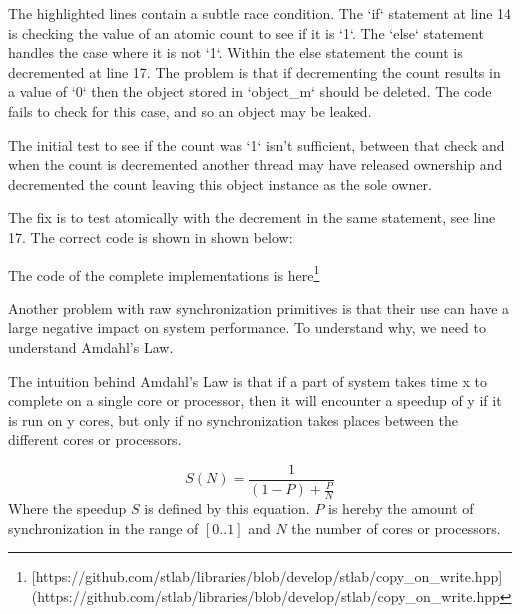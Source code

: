 \begin{minipage}{\linewidth}
	
\end{minipage}

The highlighted lines contain a subtle race condition. The `if` statement at line 14 is checking the value of an atomic count to see if it is `1`. The `else` statement handles the case where it is not `1`. Within the else statement the count is decremented at line 17. The problem is that if decrementing the count results in a value of `0` then the object stored in `object\_m` should be deleted. The code fails to check for this case, and so an object may be leaked.

The initial test to see if the count was `1` isn't sufficient, between that check and when the count is decremented another thread may have released ownership and decremented the count leaving this object instance as the sole owner.

The fix is to test atomically with the decrement in the same statement, see line 17. The correct code is shown in shown below:

\begin{minipage}{\linewidth}
	
\end{minipage}


The code of the complete implementations is here\footnote{[https://github.com/stlab/libraries/blob/develop/stlab/copy\_on\_write.hpp](https://github.com/stlab/libraries/blob/develop/stlab/copy\_on\_write.hpp}

Another problem with raw synchronization primitives is that their use can have a large negative impact on system performance. To understand why, we need to understand Amdahl's Law.

The intuition behind Amdahl's Law is that if a part of system takes time x to complete on a single core or processor, then it will encounter a speedup of y if it is run on y cores, but only if no synchronization takes places between the different cores or processors. 

$$ S(N) = \frac{1}{(1-P)+\frac{P}{N}} $$
Where the speedup $S$ is defined by this equation. $P$ is hereby the amount of synchronization in the range of $[0 .. 1]$ and $N$ the number of cores or processors.

